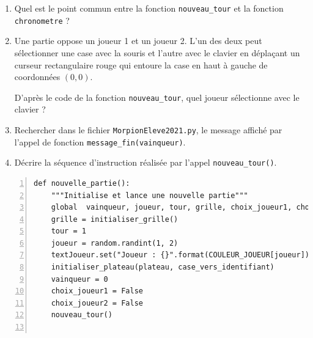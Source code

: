 \documentclass[a4paper, french, 12pt]{article}  %
\newcounter{exo}
\newcounter{exoB}
\newenvironment{exerciceB2}
{\par \bigskip  \noindent \addtocounter{exoB}{1} \hrulefill \quad { \large \textbf{Exercice \theexoB}} \quad \hrulefill \par \medskip }
{\par \bigskip }
\newcounter{def}
\begin{document}
\begin{exerciceB2}{}
\begin{enumerate}
\begin{enumerate}
	\item Quel est le point commun entre la fonction \lstinline+nouveau_tour+ et la fonction \lstinline+chronometre+ ?
	
	\item Une partie oppose un joueur 1 et un joueur 2. L'un des deux peut sélectionner une case avec la souris et l'autre avec le clavier en déplaçant un curseur rectangulaire rouge qui entoure la case en haut à gauche de coordonnées $(0,0)$.
	
D'après le code de la fonction \lstinline+nouveau_tour+, quel joueur sélectionne avec le clavier ?

\item Rechercher dans le fichier \lstinline+MorpionEleve2021.py+, le message affiché par l'appel de fonction \lstinline+message_fin(vainqueur)+.
\item Décrire la séquence d'instruction réalisée par l'appel \lstinline+nouveau_tour()+.

\end{enumerate}

\begin{lstlisting}[numbers=left]
def nouvelle_partie():
    """Initialise et lance une nouvelle partie"""
    global  vainqueur, joueur, tour, grille, choix_joueur1, choix_joueur2
    grille = initialiser_grille()
    tour = 1
    joueur = random.randint(1, 2)
    textJoueur.set("Joueur : {}".format(COULEUR_JOUEUR[joueur]))
    initialiser_plateau(plateau, case_vers_identifiant)
    vainqueur = 0
    choix_joueur1 = False
    choix_joueur2 = False
    nouveau_tour()
    

\end{lstlisting}
\end{enumerate}
\end{exerciceB2}
\end{document}

